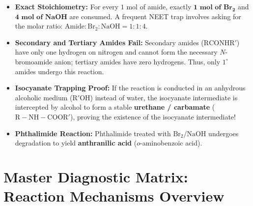 \documentclass[10pt,a4paper]{article}
\begin{document}
\begin{trapbox}
\begin{itemize}
  \item \textbf{Exact Stoichiometry:} For every $1\text{ mol}$ of amide, exactly $\mathbf{1\text{ mol of } Br_2}$ and $\mathbf{4\text{ mol of } NaOH}$ are consumed. A frequent NEET trap involves asking for the molar ratio: $\text{Amide} : \mathrm{Br_2} : \mathrm{NaOH} = 1 : 1 : 4$.
  \item \textbf{Secondary and Tertiary Amides Fail:} Secondary amides ($\mathrm{RCONHR'}$) have only one hydrogen on nitrogen and cannot form the necessary $N$-bromoamide anion; tertiary amides have zero hydrogens. Thus, only $1^\circ$ amides undergo this reaction.
  \item \textbf{Isocyanate Trapping Proof:} If the reaction is conducted in an anhydrous alcoholic medium ($\mathrm{R'OH}$) instead of water, the isocyanate intermediate is intercepted by alcohol to form a stable \textbf{urethane / carbamate} ($\mathrm{R-NH-COOR'}$), proving the existence of the isocyanate intermediate!
  \item \textbf{Phthalimide Reaction:} Phthalimide treated with $\mathrm{Br_2} / \mathrm{NaOH}$ undergoes degradation to yield \textbf{anthranilic acid} ($o$-aminobenzoic acid).
\end{itemize}
\end{trapbox}

\newpage
\section{Master Diagnostic Matrix: Reaction Mechanisms Overview}
\end{document}
